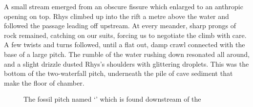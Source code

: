     A small stream emerged from an obscure fissure which enlarged to an anthropic opening on top. Rhys climbed up into the rift a metre above the water and followed the passage leading off upstream. At every meander, sharp prongs of rock remained, catching on our suits, forcing us to negotiate the climb with care. A few twists and turns followed, until a flat out, damp crawl connected with the base of a large pitch. The rumble of the water rushing down resonated all around, and a slight drizzle dusted Rhys's shoulders with glittering droplets. This was the bottom of the two-waterfall pitch, underneath the pile of  cave sediment that make the floor of  chamber.

    \begin{figure}[t!]
        \checkoddpage \ifoddpage \forcerectofloat \else \forceversofloat \fi
        \centering
        
        \caption{The fossil pitch named `\protect{}' which is found downstream of the \protect{} }
        \label{water chamber below helm's deep}
    \end{figure}
    
    \begin{survey}[b!]
        \checkoddpage \ifoddpage \forcerectofloat \else \forceversofloat \fi
        \centering

        \caption[Touching the Void - grade 1]{An extended elevation view of \protect{} chamber and adjoining \protect{} extensions }
        \label{helms deep}
         
    \end{survey}

